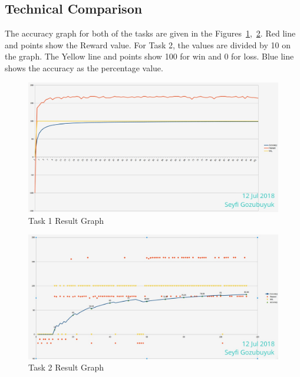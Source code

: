 \documentclass[10pt,journal,compsoc]{IEEEtran}
\begin{document}
\subsection{Technical Comparison} %
The accuracy graph for both of the tasks are given in the Figures~\ref{fig:t1g},~\ref{fig:t2g}. Red line and points show the Reward value. For Task 2, the values are divided by 10 on the graph. The Yellow line and points show 100 for win and 0 for loss. Blue line shows the accuracy as the percentage value.
\begin{figure}[thpb]
      \centering
      \includegraphics[width=\linewidth]{figures/Task1.png}
      \caption{Task 1 Result Graph}
      \label{fig:t1g}
\end{figure}

\begin{figure}[thpb]
      \centering
      \includegraphics[width=\linewidth]{figures/Task2.png}
      \caption{Task 2 Result Graph}
      \label{fig:t2g}
\end{figure}
\end{document}
